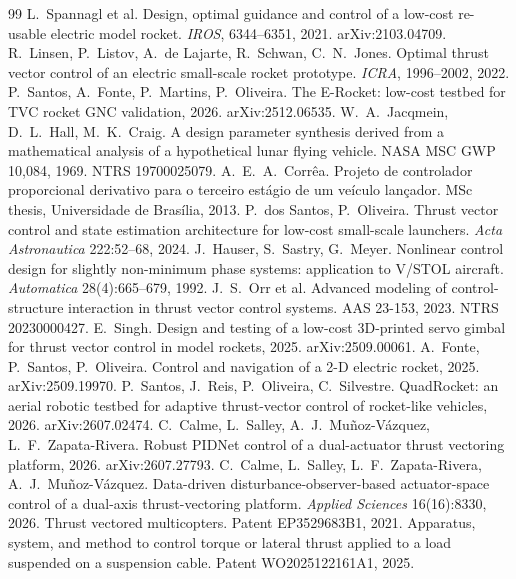\documentclass[11pt,a4paper]{article}
\begin{document}
\begin{thebibliography}{99}
 L.~Spannagl et al. Design, optimal guidance and control of a low-cost re-usable electric model rocket. \emph{IROS}, 6344--6351, 2021. arXiv:2103.04709.
 R.~Linsen, P.~Listov, A.~de Lajarte, R.~Schwan, C.~N.~Jones. Optimal thrust vector control of an electric small-scale rocket prototype. \emph{ICRA}, 1996--2002, 2022.
 P.~Santos, A.~Fonte, P.~Martins, P.~Oliveira. The E-Rocket: low-cost testbed for TVC rocket GNC validation, 2026. arXiv:2512.06535.
 W.~A.~Jacqmein, D.~L.~Hall, M.~K.~Craig. A design parameter synthesis derived from a mathematical analysis of a hypothetical lunar flying vehicle. NASA MSC GWP 10,084, 1969. NTRS 19700025079.
 A.~E.~A.~Corr\^{e}a. Projeto de controlador proporcional derivativo para o terceiro est\'{a}gio de um ve\'{i}culo lan\c{c}ador. MSc thesis, Universidade de Bras\'{i}lia, 2013.
 P.~dos Santos, P.~Oliveira. Thrust vector control and state estimation architecture for low-cost small-scale launchers. \emph{Acta Astronautica} 222:52--68, 2024.
 J.~Hauser, S.~Sastry, G.~Meyer. Nonlinear control design for slightly non-minimum phase systems: application to V/STOL aircraft. \emph{Automatica} 28(4):665--679, 1992.
 J.~S.~Orr et al. Advanced modeling of control-structure interaction in thrust vector control systems. AAS 23-153, 2023. NTRS 20230000427.
 E.~Singh. Design and testing of a low-cost 3D-printed servo gimbal for thrust vector control in model rockets, 2025. arXiv:2509.00061.
 A.~Fonte, P.~Santos, P.~Oliveira. Control and navigation of a 2-D electric rocket, 2025. arXiv:2509.19970.
 P.~Santos, J.~Reis, P.~Oliveira, C.~Silvestre. QuadRocket: an aerial robotic testbed for adaptive thrust-vector control of rocket-like vehicles, 2026. arXiv:2607.02474.
 C.~Calme, L.~Salley, A.~J.~Mu\~{n}oz-V\'{a}zquez, L.~F.~Zapata-Rivera. Robust PIDNet control of a dual-actuator thrust vectoring platform, 2026. arXiv:2607.27793.
 C.~Calme, L.~Salley, L.~F.~Zapata-Rivera, A.~J.~Mu\~{n}oz-V\'{a}zquez. Data-driven disturbance-observer-based actuator-space control of a dual-axis thrust-vectoring platform. \emph{Applied Sciences} 16(16):8330, 2026.
 Thrust vectored multicopters. Patent EP3529683B1, 2021.
 Apparatus, system, and method to control torque or lateral thrust applied to a load suspended on a suspension cable. Patent WO2025122161A1, 2025.
\end{thebibliography}
\end{document}
